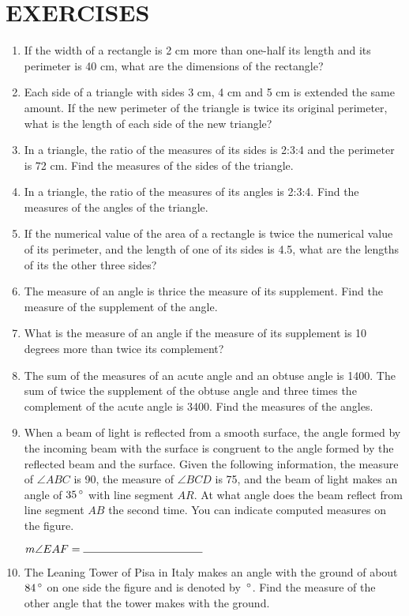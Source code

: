 \section*{EXERCISES}
\begin{enumerate}
\item If the width of a rectangle is 2 cm more than one-half its length and its perimeter is 40 cm, what are
the dimensions of the rectangle?
\item Each side of a triangle with sides 3 cm, 4 cm and 5 cm is extended the same amount. If the new
perimeter of the triangle is twice its original perimeter, what is the length of each side of the new
triangle?
\item In a triangle, the ratio of the measures of its sides is 2:3:4 and the perimeter is 72 cm. Find the
measures of the sides of the triangle.
\item In a triangle, the ratio of the measures of its angles is 2:3:4. Find the measures of the angles of the
triangle.
\item If the numerical value of the area of a rectangle is twice the numerical value of its perimeter, and
the length of one of its sides is 4.5, what are the lengths of its the other three sides?
\item The measure of an angle is thrice the measure of its supplement. Find the measure of the
supplement of the angle.
\item What is the measure of an angle if the measure of its supplement is 10 degrees more than twice its
complement?
\item The sum of the measures of an acute angle and an obtuse angle is 1400. The sum of twice the
supplement of the obtuse angle and three times the complement of the acute angle is 3400. Find the
measures of the angles.
\item When a beam of light is reflected from a
smooth surface, the angle formed by the
incoming beam with the surface is congruent
to the angle formed by the reflected beam
and the surface.
Given the following
information, the measure of $\angle ABC$ is 90, the
measure of $\angle BCD$ is 75, and the beam of
light makes an angle of $35\,\mathrm{^{\circ}}$ with line segment
$AR$. At what angle does the beam reflect
from line segment $AB$ the second time. You
can indicate computed measures on the
figure.

$m\angle EAF = \makebox[1.5in]{\hrulefill}$

\item The Leaning Tower of Pisa in Italy makes an angle with the ground of
about $84\,\mathrm{^{\circ}}$ on one side the figure and is denoted by $\,\mathrm{^{\circ}}$. Find the measure of
the other angle that the tower makes with the ground.
\end{enumerate}
